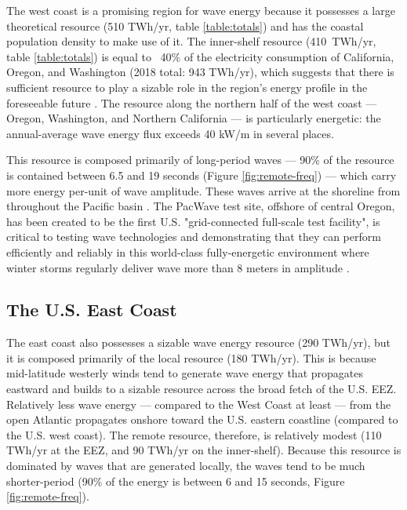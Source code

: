 The west coast is a promising region for wave energy because it possesses a large theoretical resource (510 TWh/yr, table \ref{table:totals}) and has the coastal population density to make use of it. The inner-shelf resource (410~TWh/yr, table \ref{table:totals}) is equal to ~40\% of the electricity consumption of California, Oregon, and Washington (2018 total: 943 TWh/yr), which suggests that there is sufficient resource to play a sizable role in the region's energy profile in the foreseeable future \citep{energyinformationadministrationStateEnergyConsumption2020}. The resource along the northern half of the west coast — Oregon, Washington, and Northern California — is particularly energetic: the annual-average wave energy flux exceeds 40 kW/m in several places.

This resource is composed primarily of long-period waves — 90\% of the resource is contained between 6.5 and 19 seconds (Figure \ref{fig:remote-freq}) — which carry more energy per-unit of wave amplitude. These waves arrive at the shoreline from throughout the Pacific basin \citep{perezESTELAMethodEvaluating2014}. The PacWave test site, offshore of central Oregon, has been created to be the first U.S. "grid-connected full-scale test facility", is critical to testing wave technologies and demonstrating that they can perform efficiently and reliably in this world-class fully-energetic environment where winter storms regularly deliver wave more than 8 meters in amplitude \citep[e.g.][]{allan_climate_2006}.


\subsection{The U.S. East Coast}

The east coast also possesses a sizable wave energy resource (290 TWh/yr), but it is composed primarily of the local resource (180 TWh/yr). This is because mid-latitude westerly winds tend to generate wave energy that propagates eastward and builds to a sizable resource across the broad fetch of the U.S. EEZ. Relatively less wave energy — compared to the West Coast at least — from the open Atlantic propagates onshore toward the U.S. eastern coastline (compared to the U.S. west coast). The remote resource, therefore, is relatively modest (110 TWh/yr at the EEZ, and 90 TWh/yr on the inner-shelf). Because this resource is dominated by waves that are generated locally, the waves tend to be much shorter-period (90\% of the energy is between 6 and 15 seconds, Figure \ref{fig:remote-freq}).

